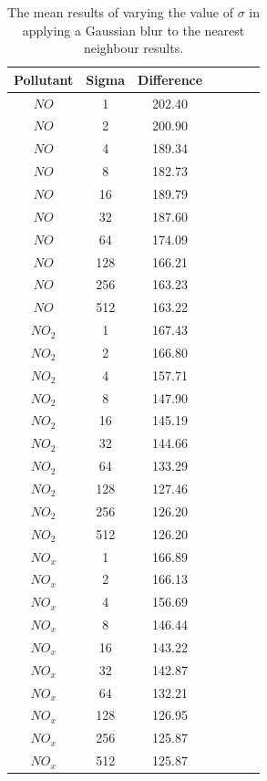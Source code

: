			\begin{table}[H]
				\centering
	    		\begin{tabular}{|c|c|c|c|c|c|c|}
	    			\hline
					Pollutant & Sigma & Difference \\ \hline
					$NO$ & 1 & 202.40 \\
					$NO$ & 2 & 200.90 \\
					$NO$ & 4 & 189.34 \\
					$NO$ & 8 & 182.73 \\
					$NO$ & 16 & 189.79 \\
					$NO$ & 32 & 187.60 \\
					$NO$ & 64 & 174.09 \\
					$NO$ & 128 & 166.21 \\
					$NO$ & 256 & 163.23 \\
					$NO$ & 512 & 163.22 \\
					$NO_{2}$ & 1 & 167.43 \\
					$NO_{2}$ & 2 & 166.80 \\
					$NO_{2}$ & 4 & 157.71 \\
					$NO_{2}$ & 8 & 147.90 \\
					$NO_{2}$ & 16 & 145.19 \\
					$NO_{2}$ & 32 & 144.66 \\
					$NO_{2}$ & 64 & 133.29 \\
					$NO_{2}$ & 128 & 127.46 \\
					$NO_{2}$ & 256 & 126.20 \\
					$NO_{2}$ & 512 & 126.20 \\
					$NO_{x}$ & 1 & 166.89 \\
					$NO_{x}$ & 2 & 166.13 \\
					$NO_{x}$ & 4 & 156.69 \\
					$NO_{x}$ & 8 & 146.44 \\
					$NO_{x}$ & 16 & 143.22 \\
					$NO_{x}$ & 32 & 142.87 \\
					$NO_{x}$ & 64 & 132.21 \\
					$NO_{x}$ & 128 & 126.95 \\
					$NO_{x}$ & 256 & 125.87 \\
					$NO_{x}$ & 512 & 125.87 \\ \hline
				\end{tabular}
				\caption{The mean results of varying the value of $\sigma$ in applying a Gaussian blur to the nearest neighbour results.}
				\label{tab:nearest_neighbour_convolution_sigma_results}
			\end{table}

